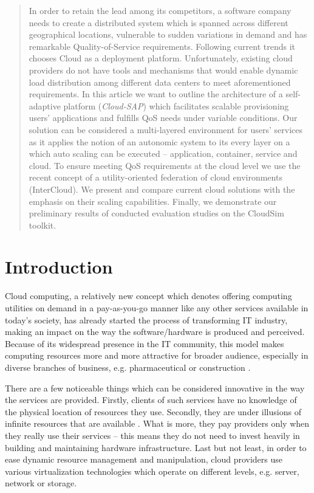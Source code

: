 \documentclass[twocolumn]{svjour3}          %
\begin{document}
\begin{abstract}
In order to retain the lead among its competitors, a software company needs to create a distributed system which is spanned across different geographical locations, vulnerable to sudden variations in demand and has remarkable Quality-of-Service requirements. Following current trends it chooses Cloud as a deployment platform. Unfortunately, existing cloud providers do not have tools and mechanisms that would enable dynamic load distribution among different data centers to meet aforementioned requirements.
In this article we want to outline the architecture of a self-adaptive platform (\emph{Cloud-SAP}) which facilitates scalable provisioning users' applications and fulfills QoS needs under variable conditions. Our solution can be considered a multi-layered environment for users' services as it applies the notion of an autonomic system to its every layer on a which auto scaling can be executed -- application, container, service and cloud. To ensure meeting QoS requirements at the cloud level we use the recent concept of a utility-oriented federation of cloud environments (InterCloud).
We present and compare current cloud solutions with the emphasis on their scaling capabilities. Finally, we demonstrate our preliminary results of conducted evaluation studies on the CloudSim toolkit. 

\end{abstract}

\section{Introduction}
\label{intro}
Cloud computing, a relatively new concept which denotes offering computing utilities on demand in a pay-as-you-go manner like any other services available in today's society, has already started the process of transforming IT industry, making an impact on the way the software/hardware is produced and perceived. Because of its widespread presence in the IT community, this model makes computing resources more and more attractive for broader audience, especially in diverse branches of business, e.g. pharmaceutical or construction \cite{PharmaComputation}.

There are a few noticeable things which can be considered innovative in the way the services are provided. Firstly, clients of such services have no knowledge of the physical location of resources they use. Secondly, they are under illusions of infinite resources that are available \cite{ScalingInDaCloud}. What is more, they pay providers only when they really use their services -- this means they do not need to invest heavily in building and maintaining hardware infrastructure. Last but not least, in order to ease dynamic resource management and manipulation, cloud providers use various virtualization technologies which operate on different levels, e.g. server, network or storage.
\end{document}
